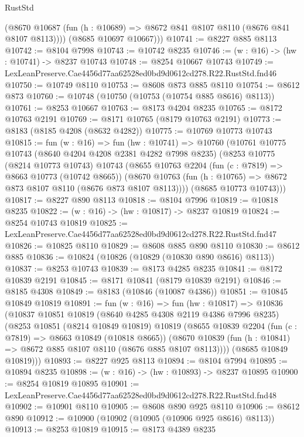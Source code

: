 \begin{lexlean}{RustStd}
\begin{coremodule}
          (@8670 @10687 (fun (h : @10689) => @8672 @841 @8107 @8110 (@8676 @841 @8107 @8113))))
        (@8685 @10697 @10667)))
@10741 := @8227 @885 @8113
@10742 := @8104 @7998
@10743 := @10742 @8235
@10746 := (w : @16) -> (hw : @10741) -> @8237 @10743
@10748 := @8254 @10667 @10743
@10749 := LexLeanPreserve.Cae4456d77aa62528ed0bd9d0612cd278.R22.RustStd.fnd46
@10750 := @10749 @8110
@10753 := @8608 @873 @885 @8110
@10754 := @8612 @873
@10760 := @10748 (@10750 (@10753 (@10754 @885 @8616) @8113))
@10761 := @8253 @10667
@10763 := @8173 @4204 @8235
@10765 := @8172 @10763 @2191
@10769 := @8171 @10765 (@8179 @10763 @2191)
@10773 := @8183 (@8185 @4208 (@8632 @4282))
@10775 := @10769 @10773 @10743
@10815 := fun (w : @16) =>
  fun (hw : @10741) =>
  @10760
    (@10761
      @10775
      @10743
      (@8640 @4204 @4208 @2381 @4282 @7998 @8235)
      (@8253
        @10775
        (@8214 @10773 @10743)
        @10743
        (@8655
          @10763
          @2204
          (fun (c : @7819) => @8663 @10773 (@10742 @8665))
          (@8670 @10763 (fun (h : @10765) => @8672 @873 @8107 @8110 (@8676 @873 @8107 @8113))))
        (@8685 @10773 @10743)))
@10817 := @8227 @890 @8113
@10818 := @8104 @7996
@10819 := @10818 @8235
@10822 := (w : @16) -> (hw : @10817) -> @8237 @10819
@10824 := @8254 @10743 @10819
@10825 := LexLeanPreserve.Cae4456d77aa62528ed0bd9d0612cd278.R22.RustStd.fnd47
@10826 := @10825 @8110
@10829 := @8608 @885 @890 @8110
@10830 := @8612 @885
@10836 := @10824 (@10826 (@10829 (@10830 @890 @8616) @8113))
@10837 := @8253 @10743
@10839 := @8173 @4285 @8235
@10841 := @8172 @10839 @2191
@10845 := @8171 @10841 (@8179 @10839 @2191)
@10846 := @8185 @4308
@10849 := @8183 (@10846 (@10087 @4386))
@10851 := @10845 @10849 @10819
@10891 := fun (w : @16) =>
  fun (hw : @10817) =>
  @10836
    (@10837
      @10851
      @10819
      (@8640 @4285 @4308 @2119 @4386 @7996 @8235)
      (@8253
        @10851
        (@8214 @10849 @10819)
        @10819
        (@8655
          @10839
          @2204
          (fun (c : @7819) => @8663 @10849 (@10818 @8665))
          (@8670 @10839 (fun (h : @10841) => @8672 @885 @8107 @8110 (@8676 @885 @8107 @8113))))
        (@8685 @10849 @10819)))
@10893 := @8227 @925 @8113
@10894 := @8104 @7994
@10895 := @10894 @8235
@10898 := (w : @16) -> (hw : @10893) -> @8237 @10895
@10900 := @8254 @10819 @10895
@10901 := LexLeanPreserve.Cae4456d77aa62528ed0bd9d0612cd278.R22.RustStd.fnd48
@10902 := @10901 @8110
@10905 := @8608 @890 @925 @8110
@10906 := @8612 @890
@10912 := @10900 (@10902 (@10905 (@10906 @925 @8616) @8113))
@10913 := @8253 @10819
@10915 := @8173 @4389 @8235

\end{coremodule}
\end{lexlean}
